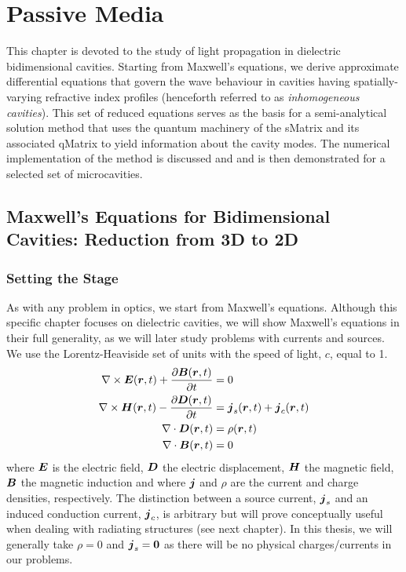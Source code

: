 \chapter{Passive Media}
This chapter is devoted to the study of light propagation in 
dielectric bidimensional cavities. Starting from Maxwell's equations, 
we derive approximate differential equations that govern 
the wave behaviour in cavities having spatially-varying 
refractive index profiles (henceforth referred to as 
\textit{inhomogeneous cavities}). This set of reduced equations
serves as the basis for a semi-analytical solution method 
that uses the quantum machinery of the \gls{sMatrix}
and its associated \gls{qMatrix} to yield information
about the cavity modes. The numerical implementation of the
method is discussed and and is then demonstrated for a selected
set of microcavities. 

\section{Maxwell's Equations for Bidimensional Cavities: Reduction from 3D to 2D}
\subsection{Setting the Stage}
As with any problem in optics, we start from Maxwell's equations. Although 
this specific chapter focuses on dielectric cavities, we will show Maxwell's equations
in their full generality, as we will later study problems with currents and sources. 
We use the Lorentz-Heaviside set of units with the speed of light, $c$, equal to 1. 
  \begin{subequations}
  \begin{align}
   \nabla\times\boldsymbol{E}(\boldsymbol{r},t)+\frac{\partial\boldsymbol{B}(\boldsymbol{r},t)}{\partial t}	&=0			\\
   \nabla\times\boldsymbol{H}(\boldsymbol{r},t)-\frac{\partial\boldsymbol{D}(\boldsymbol{r},t)}{\partial t}	&=\boldsymbol{j}_s(\boldsymbol{r},t)+\boldsymbol{j}_c(\boldsymbol{r},t)	\\
   \nabla\cdot\boldsymbol{D}(\boldsymbol{r},t)							&=\rho(\boldsymbol{r},t)			\\
   \nabla\cdot\boldsymbol{B}(\boldsymbol{r},t)							&=0
  \end{align}
  \end{subequations}
where $\boldsymbol{E}$ is the electric field, $\boldsymbol{D}$ the electric displacement, $\boldsymbol{H}$
the magnetic field, $\boldsymbol{B}$ the magnetic induction and where 
$\boldsymbol{j}$ and $\rho$ are the current and charge densities, respectively. 
The distinction between a source current, $\boldsymbol{j}_s$ and an induced conduction
current, $\boldsymbol{j}_c$, is arbitrary but will prove conceptually useful when dealing
with radiating structures (see next chapter).
In this thesis, we will generally take $\rho=0$ and $\boldsymbol{j}_s=\boldsymbol{0}$
as there will be no physical charges/currents in our problems.

